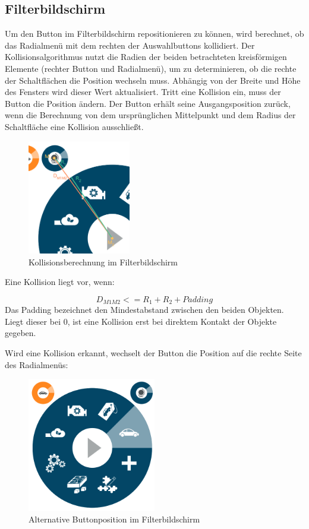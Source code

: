 \subsection{Filterbildschirm}
Um den Button im Filterbildschirm repositionieren zu können, wird berechnet, ob das Radialmenü mit dem rechten der Auswahlbuttons kollidiert. Der Kollisionsalgorithmus nutzt die Radien der beiden betrachteten kreisförmigen Elemente (rechter Button und Radialmenü), um zu determinieren, ob die rechte der Schaltflächen die Position wechseln muss. Abhängig von der Breite und Höhe des Fensters wird dieser Wert aktualisiert. Tritt eine Kollision ein, muss der Button die Position ändern. Der Button erhält seine Ausgangsposition zurück, wenn die Berechnung von dem ursprünglichen Mittelpunkt und dem Radius der Schaltfläche eine Kollision ausschließt.\par
\begin{figure}[H]
 \centering
 \includegraphics[width=0.4\textwidth]{grafiken/radius.png}
 \caption{Kollisionsberechnung im Filterbildschirm}
 \label{fig:collisionFilter}
\end{figure}
Eine Kollision liegt vor, wenn:\par
\begin{equation}
	D_{M1M2} <= R_1 + R_2 + Padding
\end{equation}
Das Padding bezeichnet den Mindestabstand zwischen den beiden Objekten. Liegt dieser bei 0, ist eine Kollision erst bei direktem Kontakt der Objekte gegeben.\par
Wird eine Kollision erkannt, wechselt der Button die Position auf die rechte Seite des Radialmenüs:
\begin{figure}[H]
 \centering
 \includegraphics[width=0.5\textwidth]{grafiken/fix_filter.png}
 \caption{Alternative Buttonposition im Filterbildschirm}
 \label{fig:fixFilter}
\end{figure}